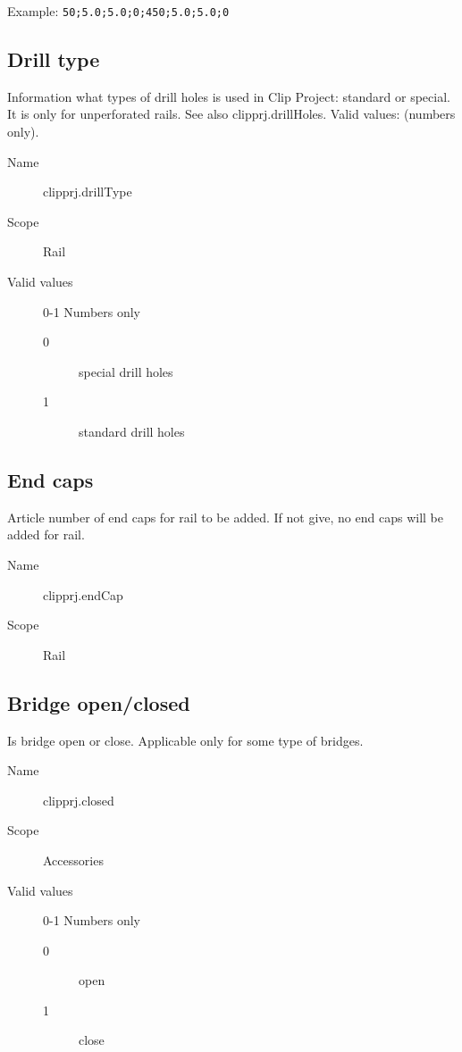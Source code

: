 \documentclass[%
	a4paper,
	oneside,
	listof=numbered,
	parskip=half,
	headsepline=true,
	footsepline=true,
	]{scrbook}
\begin{document}
Example: \verb|50;5.0;5.0;0;450;5.0;5.0;0|

\subsection{Drill type}

Information what types of drill holes is used in Clip Project: standard or special. It is only for unperforated rails. See also clipprj.drillHoles. Valid values: (numbers only).

\begin{description}
	\item[Name] clipprj.drillType
	\item[Scope] Rail
	\item[Valid values] 0-1 Numbers only
	\begin{description}
		\item[0] special drill holes
		\item[1] standard drill holes
	\end{description}
\end{description}

\subsection{End caps}

Article number of end caps for rail to be added. If not give, no end caps will be added for rail.

\begin{description}
	\item[Name] clipprj.endCap
	\item[Scope] Rail
\end{description}

\subsection{Bridge open/closed}

Is bridge open or close. Applicable only for some type of bridges.

\begin{description}
	\item[Name] clipprj.closed
	\item[Scope] Accessories
	\item[Valid values] 0-1 Numbers only
	\begin{description}
		\item[0] open
		\item[1] close
	\end{description}
\end{description}
\end{document}
